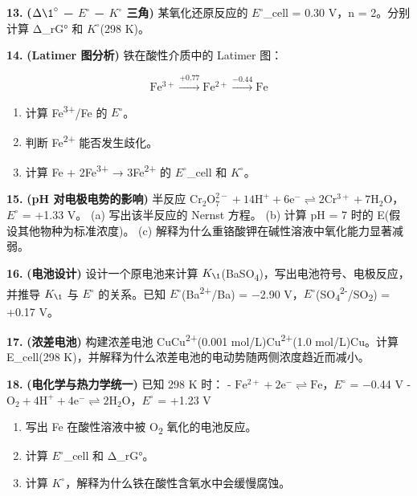 \documentclass[a4paper,11pt]{ctexart}
\providecommand{\tightlist}{\setlength{\itemsep}{0pt}\setlength{\parskip}{0pt}}
\begin{document}
\textbf{13.} \textbf{(\(\Delta \1^{\circ}\) − \(E^{\circ}\) − \(K^{\circ}\) 三角)} 某氧化还原反应的 \(E^{\circ}\)\_cell = 0.30 V，n = 2。分别计算 Δ\_rG° 和 \(K^{\circ}\)(298 K)。

\textbf{14.} \textbf{(Latimer 图分析)} 铁在酸性介质中的 Latimer 图：

\[\mathrm{Fe^{3+}} \xrightarrow{+0.77} \mathrm{Fe^{2+}} \xrightarrow{-0.44} \mathrm{Fe}\]

\begin{enumerate}
\def\labelenumi{(\alph{enumi})}
\tightlist
\item
  计算 Fe\textsuperscript{3+}/Fe 的 \(E^{\circ}\)。
\item
  判断 Fe\textsuperscript{2+} 能否发生歧化。
\item
  计算 Fe + 2Fe\textsuperscript{3+} → 3Fe\textsuperscript{2+} 的 \(E^{\circ}\)\_cell 和 \(K^{\circ}\)。
\end{enumerate}

\textbf{15.} \textbf{(pH 对电极电势的影响)} 半反应 \(\mathrm{Cr_2O_7^{2-} + 14H^+ + 6e^- \rightleftharpoons 2Cr^{3+} + 7H_2O}\)，\(E^{\circ}\) = +1.33 V。
(a) 写出该半反应的 Nernst 方程。
(b) 计算 pH = 7 时的 E(假设其他物种为标准浓度)。
(c) 解释为什么重铬酸钾在碱性溶液中氧化能力显著减弱。

\textbf{16.} \textbf{(电池设计)} 设计一个原电池来计算 \(K_{\1}\)(BaSO\textsubscript{4})，写出电池符号、电极反应，并推导 \(K_{\1}\) 与 \(E^{\circ}\) 的关系。已知 \(E^{\circ}\)(Ba\textsuperscript{2+}/Ba) = −2.90 V，\(E^{\circ}\)(SO\textsubscript{4}\textsuperscript{2-}/SO\textsubscript{2}) = +0.17 V。

\textbf{17.} \textbf{(浓差电池)} 构建浓差电池 Cu\textbar Cu\textsuperscript{2+}(0.001 mol/L)\textbar\textbar Cu\textsuperscript{2+}(1.0 mol/L)\textbar Cu。计算 E\_cell(298 K)，并解释为什么浓差电池的电动势随两侧浓度趋近而减小。

\textbf{18.} \textbf{(电化学与热力学统一)} 已知 298 K 时：
- \(\mathrm{Fe^{2+} + 2e^- \rightleftharpoons Fe}\)，\(E^{\circ}\) = −0.44 V
- \(\mathrm{O_2 + 4H^+ + 4e^- \rightleftharpoons 2H_2O}\)，\(E^{\circ}\) = +1.23 V

\begin{enumerate}
\def\labelenumi{(\alph{enumi})}
\tightlist
\item
  写出 Fe 在酸性溶液中被 O\textsubscript{2} 氧化的电池反应。
\item
  计算 \(E^{\circ}\)\_cell 和 Δ\_rG°。
\item
  计算 \(K^{\circ}\)，解释为什么铁在酸性含氧水中会缓慢腐蚀。
\end{enumerate}
\end{document}
